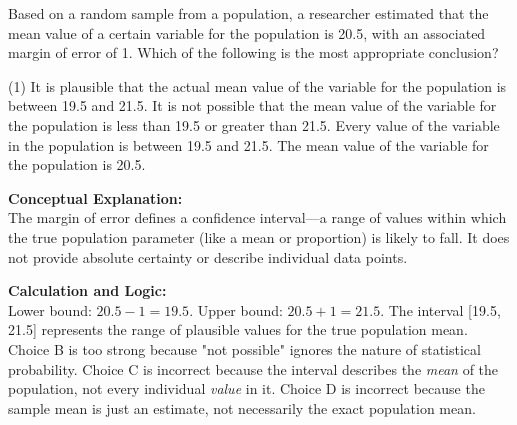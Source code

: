 \documentclass[11pt,paper=a4,answers]{exam}
\begin{document}
\begin{questions}
\pointsinrightmargin
\pointsdroppedatright
\marksnotpoints
{}
\pointformat{\boldmath\themarginpoints}
\bracketedpoints



\question
Based on a random sample from a population, a researcher estimated that the mean value of a certain variable for the population is 20.5, with an associated margin of error of 1. Which of the following is the most appropriate conclusion?
\begin{tasks}(1)
    \task It is plausible that the actual mean value of the variable for the population is between 19.5 and 21.5.
    \task It is not possible that the mean value of the variable for the population is less than 19.5 or greater than 21.5.
    \task Every value of the variable in the population is between 19.5 and 21.5.
    \task The mean value of the variable for the population is 20.5.
\end{tasks}

\begin{solution}
\textbf{Conceptual Explanation:} \\
The margin of error defines a confidence interval—a range of values within which the true population parameter (like a mean or proportion) is likely to fall. It does not provide absolute certainty or describe individual data points.

\vspace{30pt}

\textbf{Calculation and Logic:} \\
Lower bound: $20.5 - 1 = 19.5$. Upper bound: $20.5 + 1 = 21.5$. The interval [19.5, 21.5] represents the range of plausible values for the true population mean. Choice B is too strong because "not possible" ignores the nature of statistical probability. Choice C is incorrect because the interval describes the \textit{mean} of the population, not every individual \textit{value} in it. Choice D is incorrect because the sample mean is just an estimate, not necessarily the exact population mean.

\vspace{30pt}


\end{solution}
\end{questions}
\end{document}
